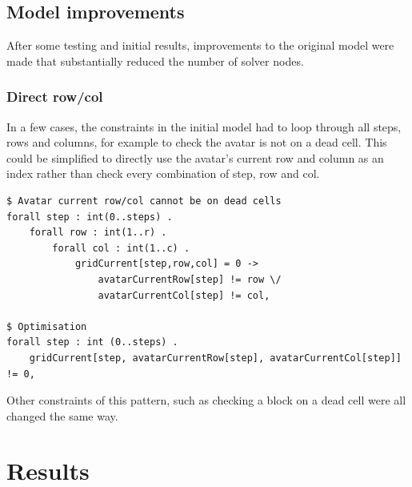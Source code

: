 \documentclass{article}
\begin{document}
\subsection{Model improvements}
After some testing and initial results, improvements to the original model were made that substantially reduced the number of solver nodes. 
\subsubsection{Direct row/col}
In a few cases, the constraints in the initial model had to loop through all steps, rows and columns, for example to check the avatar is not on a dead cell. This could be simplified to directly use the avatar's current row and column as an index rather than check every combination of step, row and col.
\begin{lstlisting}[caption={Example of optimising number of constraints by directly indexing with \texttt{avatarCurrentRow} and \texttt{avatarCurrentCol}.}, captionpos=b]
$ Avatar current row/col cannot be on dead cells
forall step : int(0..steps) .
    forall row : int(1..r) .
        forall col : int(1..c) .
	    	gridCurrent[step,row,col] = 0 -> 
	    		avatarCurrentRow[step] != row \/ 
	    		avatarCurrentCol[step] != col,

$ Optimisation
forall step : int (0..steps) .
    gridCurrent[step, avatarCurrentRow[step], avatarCurrentCol[step]] != 0,
\end{lstlisting}
Other constraints of this pattern, such as checking a block on a dead cell were all changed the same way.

\section{Results}
\end{document}

